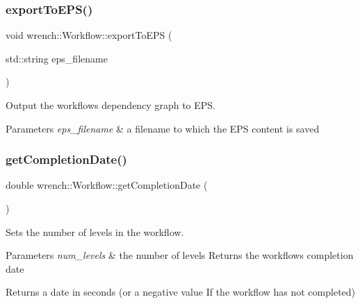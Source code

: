 \subsubsection{\texorpdfstring{export\+To\+E\+P\+S()}{exportToEPS()}}
{\footnotesize\ttfamily void wrench\+::\+Workflow\+::export\+To\+E\+PS (\begin{DoxyParamCaption}\item[{std\+::string}]{eps\+\_\+filename }\end{DoxyParamCaption})}



Output the workflow\textquotesingle{}s dependency graph to E\+PS. 


\begin{DoxyParams}{Parameters}
{\em eps\+\_\+filename} & a filename to which the E\+PS content is saved \\
\hline
\end{DoxyParams}
\mbox{\label{classwrench_1_1_workflow_ac3a1291469d2c0035352a99f0f964f3f}} 
\subsubsection{\texorpdfstring{get\+Completion\+Date()}{getCompletionDate()}}
{\footnotesize\ttfamily double wrench\+::\+Workflow\+::get\+Completion\+Date (\begin{DoxyParamCaption}{ }\end{DoxyParamCaption})}



Sets the number of levels in the workflow. 


\begin{DoxyParams}{Parameters}
{\em num\+\_\+levels} & the number of levels Returns the workflow\textquotesingle{}s completion date \\
\hline
\end{DoxyParams}
\begin{DoxyReturn}{Returns}
a date in seconds (or a negative value If the workflow has not completed) 
\end{DoxyReturn}
\mbox{\label{classwrench_1_1_workflow_a19b3b6f36f684f8c367f42a818b0a0c2}} 
